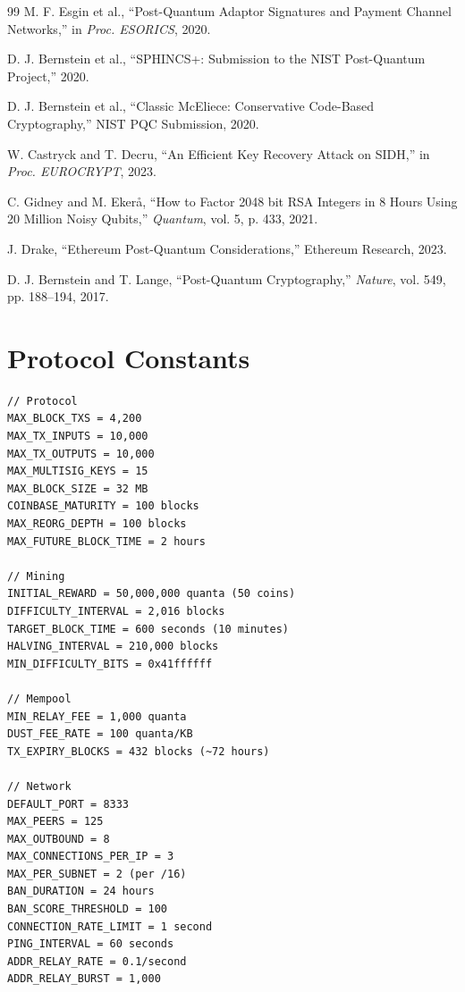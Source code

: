\documentclass[11pt,a4paper]{article}
\begin{document}
\begin{thebibliography}{99}
M. F. Esgin et al., ``Post-Quantum Adaptor Signatures and Payment Channel Networks,'' in \textit{Proc. ESORICS}, 2020.

D. J. Bernstein et al., ``SPHINCS+: Submission to the NIST Post-Quantum Project,'' 2020.

D. J. Bernstein et al., ``Classic McEliece: Conservative Code-Based Cryptography,'' NIST PQC Submission, 2020.

W. Castryck and T. Decru, ``An Efficient Key Recovery Attack on SIDH,'' in \textit{Proc. EUROCRYPT}, 2023.

C. Gidney and M. Eker\aa{}, ``How to Factor 2048 bit RSA Integers in 8 Hours Using 20 Million Noisy Qubits,'' \textit{Quantum}, vol. 5, p. 433, 2021.

J. Drake, ``Ethereum Post-Quantum Considerations,'' Ethereum Research, 2023.

D. J. Bernstein and T. Lange, ``Post-Quantum Cryptography,'' \textit{Nature}, vol. 549, pp. 188--194, 2017.

\end{thebibliography}


\appendix

\section{Protocol Constants}

\begin{lstlisting}
// Protocol
MAX_BLOCK_TXS = 4,200
MAX_TX_INPUTS = 10,000
MAX_TX_OUTPUTS = 10,000
MAX_MULTISIG_KEYS = 15
MAX_BLOCK_SIZE = 32 MB
COINBASE_MATURITY = 100 blocks
MAX_REORG_DEPTH = 100 blocks
MAX_FUTURE_BLOCK_TIME = 2 hours

// Mining
INITIAL_REWARD = 50,000,000 quanta (50 coins)
DIFFICULTY_INTERVAL = 2,016 blocks
TARGET_BLOCK_TIME = 600 seconds (10 minutes)
HALVING_INTERVAL = 210,000 blocks
MIN_DIFFICULTY_BITS = 0x41ffffff

// Mempool
MIN_RELAY_FEE = 1,000 quanta
DUST_FEE_RATE = 100 quanta/KB
TX_EXPIRY_BLOCKS = 432 blocks (~72 hours)

// Network
DEFAULT_PORT = 8333
MAX_PEERS = 125
MAX_OUTBOUND = 8
MAX_CONNECTIONS_PER_IP = 3
MAX_PER_SUBNET = 2 (per /16)
BAN_DURATION = 24 hours
BAN_SCORE_THRESHOLD = 100
CONNECTION_RATE_LIMIT = 1 second
PING_INTERVAL = 60 seconds
ADDR_RELAY_RATE = 0.1/second
ADDR_RELAY_BURST = 1,000
\end{lstlisting}
\end{document}
